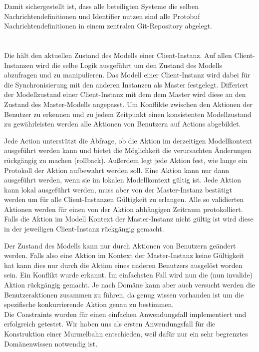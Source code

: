 Damit sichergestellt ist, dass alle beteiligten Systeme die selben
Nachrichtendefinitionen und Identifier nutzen sind alle Protobuf
Nachrichtendefinitionen in einem zentralen Git-Repository abgelegt.

\section{\constructionLogic} \label{sec:constructionlogic}

Die \constructionLogic hält den aktuellen Zustand des Modells einer
Client-Instanz. Auf allen Client-Instanzen wird die selbe Logik ausgeführt um
den Zustand des Modells abzufragen und zu manipulieren. Das Modell einer
Client-Instanz wird dabei für die Synchronisierung mit den anderen Instanzen als
Master festgelegt. Differiert der Modellzustand einer Client-Instanz mit dem dem
Master wird diese an den Zustand des Master-Modells angepasst. Um Konflikte
zwischen den Aktionen der Benutzer zu erkennen und zu jedem Zeitpunkt einen
konsistenten Modellzustand zu gewährleisten werden alle Aktionen von Benutzern
auf Actions abgebildet.

Jede Action unterstützt die Abfrage, ob die Aktion im derzeitigen Modellkontext
ausgeführt werden kann und bietet die Möglichkeit die verursachten Änderungen
rückgängig zu machen (rollback). Außerdem legt jede Aktion fest, wie lange ein
Protokoll der Aktion aufbewahrt werden soll. Eine Aktion kann nur dann
ausgeführt werden, wenn sie im lokalen Modellkontext gültig ist. Jede Aktion
kann lokal ausgeführt werden, muss aber von der Master-Instanz bestätigt werden
um für alle Client-Instanzen Gültigkeit zu erlangen. Alle so validierten
Aktionen werden für einen von der Aktion abhängigen Zeitraum protokolliert.
Falls die Aktion im Modell Kontext der Master-Instanz nicht gültig ist wird
diese in der jeweiligen Client-Instanz rückgängig gemacht.

Der Zustand des Modells kann nur durch Aktionen von Benutzern geändert werden.
Falls also eine Aktion im Kontext der Master-Instanz keine Gültigkeit hat kann
dies nur durch die Aktion eines anderen Benutzers ausgelöst worden sein. Ein
Konflikt wurde erkannt. Im einfachsten Fall wird nun die (nun invalide) Aktion
rückgängig gemacht. Je nach Domäne kann aber auch versucht werden die
Benutzeraktionen zusammen zu führen, da genug wissen vorhanden ist um die
spezifische konkurrierende Aktion genau zu bestimmen.\\

Die Constraints wurden für einen einfachen Anwendungsfall
implementiert und erfolgreich getestet. Wir haben uns als ersten Anwendungsfall
für die Konstruktion einer Murmelbahn entschieden, weil dafür nur ein sehr
begrenztes Domänenwissen notwendig ist.

